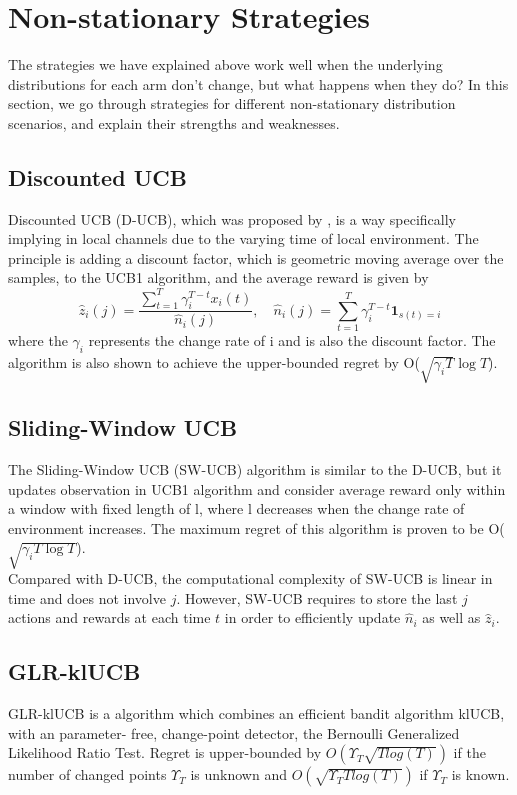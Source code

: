 \section{Non-stationary Strategies}\label{sec:non-stationary-strategies}
The strategies we have explained above work well when the underlying distributions for each arm don't change, but what happens when they do?
In this section, we go through strategies for different non-stationary distribution scenarios, and explain their strengths and weaknesses.

\subsection{Discounted UCB}\label{subsec:discounted-ucb}
Discounted UCB (D-UCB), which was proposed by \citep{kocsis2006discounted}, is a way specifically implying in local channels due to the varying time of local environment.
The principle is adding a discount factor, which is geometric moving average over the samples, to the UCB1 algorithm, and the average reward is given by
\begin{equation*}
    \hat{z}_i(j)=\frac{\sum\nolimits_{t=1}^T\gamma_i^{T-t}x_i(t)}{\hat{n}_i(j)}, \quad
    {\hat{n}_i(j)}=\sum_{t=1}^T\gamma_i^{T-t}\textbf{1}_{s(t)=i}
\end{equation*}where the $\gamma_i$ represents the change rate of i and is also the discount factor.
The algorithm is also shown to achieve the upper-bounded regret by O($\sqrt{\gamma_{i}T}\log{T}$)\citep{garivier2008upper}.

\subsection{Sliding-Window UCB}\label{subsec:sliding-window-ucb}
The Sliding-Window UCB (SW-UCB) algorithm is similar to the D-UCB, but it updates observation in UCB1 algorithm and consider average reward only within a window with fixed length of l, where l decreases when the change rate of environment increases.
The maximum regret of this algorithm is proven to be O($\sqrt{\gamma_{i}T\log{T}}$)\citep{garivier2008upper}.
\\Compared with D-UCB, the computational complexity of SW-UCB is linear in time and does not involve $j$. However, SW-UCB requires to store the last $j$ actions and rewards at each time $t$ in order to efficiently update ${\hat{n}_i}$ as well as ${\hat{z}_i}$.\citep{garivier2008upper}

\subsection{GLR-klUCB}\label{subsec:glr-klucb}
GLR-klUCB is a algorithm which combines an efficient bandit algorithm klUCB, with an parameter- free, change-point detector, the Bernoulli Generalized Likelihood Ratio Test.
Regret is upper-bounded by $ O(\Upsilon_T \sqrt{T log(T)} )$ if the number of changed points $\Upsilon_T $ is unknown and $ O(\sqrt{\Upsilon_T T log(T)} )$ if  $\Upsilon_T $ is known.\citep{Besson2019}


